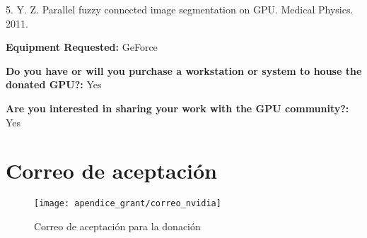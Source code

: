 5.	Y. Z. Parallel fuzzy connected image segmentation on GPU. Medical Physics. 2011.


\textbf{Equipment Requested:} GeForce

\textbf{Do you have or will you purchase a workstation or system to house the donated GPU?:} Yes

\textbf{Are you interested in sharing your work with the GPU community?:} Yes

\section{Correo de aceptación}

\begin{figure}[H]
    \centering
    \texttt{[image: apendice\_grant/correo\_nvidia]}
    \caption{Correo de aceptación para la donación}\label{fig:aceptaccion}
\end{figure}
